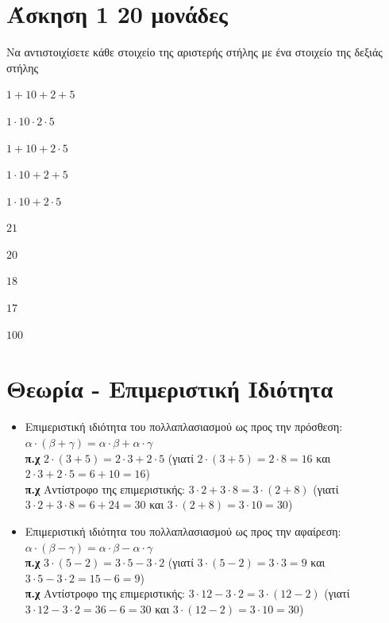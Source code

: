 \documentclass[a4paper,10pt]{report}
\begin{document}
\section*{Άσκηση 1  \hfill \small{} 20 μονάδες}
Να αντιστοιχίσετε κάθε στοιχείο της αριστερής στήλης με ένα στοιχείο της δεξιάς στήλης
\begin{itemize}
\begin{multicols}{2}
 \item $1+10+2+5$
 \item $1\cdot10\cdot2\cdot5$
 \item $1+10+2\cdot5$
 \item $1\cdot10+2+5$
 \item $1\cdot10+2\cdot5$
 \item $21$
 \item $20$
 \item $18$
 \item $17$
 \item $100$
\end{multicols}
\end{itemize}


\section*{Θεωρία - Επιμεριστική Ιδιότητα  \hfill \small{}}
\begin{itemize}
 \item Επιμεριστική ιδιότητα του πολλαπλασιασμού ως προς την πρόσθεση: $α \cdot (β+γ)=α\cdot β+α\cdot γ$ \\
 \textbf{π.χ } $2\cdot(3+5)=2\cdot3+2\cdot5$ (γιατί $2\cdot (3+5)=2\cdot 8=16$ και $2\cdot3+2\cdot5=6+10=16$) \\ 
 \textbf{π.χ }Αντίστροφο της επιμεριστικής: $3\cdot2+3\cdot8=3\cdot(2+8)$  
(γιατί $3\cdot 2+3\cdot8=6+24=30$ και $3\cdot(2+8)=3\cdot10=30$) \\ 
 \item Επιμεριστική ιδιότητα του πολλαπλασιασμού ως προς την αφαίρεση: $α \cdot (β-γ)=α\cdot β-α\cdot γ$ \\
 \textbf{π.χ } $3\cdot(5-2)=3\cdot5-3\cdot2$ (γιατί $3\cdot (5-2)=3\cdot 3=9$ και $3\cdot5-3\cdot2=15-6=9$) \\ 
 \textbf{π.χ }Αντίστροφο της επιμεριστικής: $3\cdot12- 3\cdot2=3\cdot(12-2)$  
(γιατί $3\cdot 12 -3\cdot2=36-6=30$ και $3\cdot(12-2)=3\cdot10=30$) \\
\end{itemize}
\end{document}

